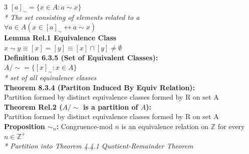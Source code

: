 \documentclass[10pt,landscape]{article}
\begin{document}
\begin{multicols}{3}
    $[a]_\sim = \{ x \in A : a \sim x \}$ \\
    \textit{* The set consisting of elements related to a} \\
    $\forall a \in A (x \in [a]_\sim \leftrightarrow a \sim x)$ \\
    \textbf{Lemma Rel.1 Equivalence Class} \\
    $x \sim y \equiv [x] = [y] \equiv [x] \cap [y] \neq \emptyset$ \\
    \textbf{Definition 6.3.5 (Set of Equivalent Classes):} \\
    $A /\sim = \{ [x]_\sim : x \in A \}$ \\
    \textit{* set of all equivalence classes} \\
    \textbf{Theorem 8.3.4 (Partiton Induced By Equiv Relation):} \\
    Partition formed by distinct equivalence classes formed by R on set A \\
    \textbf{Theorem Rel.2 ($A /\sim$ is a partition of $A$):} \\
    Partition formed by distinct equivalence classes formed by R on set A \\
    \textbf{Proposition ${\sim}_n$: } Congruence-mod $n$ is an equivalence relation on $\mathbb{Z}$ for every $n \in \mathbb{Z}^+$ \\
    \textit{* Partition into {Theorem 4.4.1 Quotient-Remainder Theorem}} \\

\end{multicols}
\end{document}
